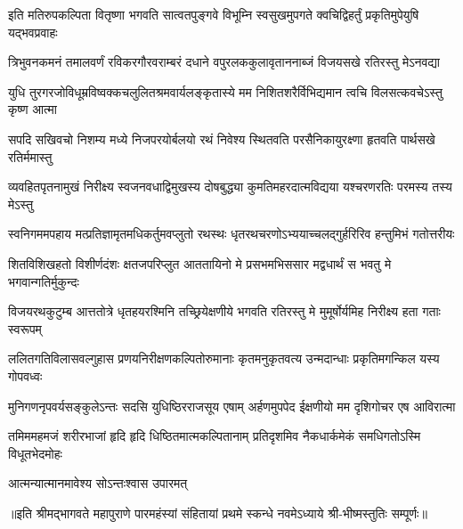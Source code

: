 

\twolineshloka
{इति मतिरुपकल्पिता वितृष्णा भगवति सात्वतपुङ्गवे विभूम्नि}
{स्वसुखमुपगते क्वचिद्विहर्तुं प्रकृतिमुपेयुषि यद्भवप्रवाहः}

\twolineshloka
{त्रिभुवनकमनं तमालवर्णं रविकरगौरवराम्बरं दधाने}
{वपुरलककुलावृताननाब्जं विजयसखे रतिरस्तु मेऽनवद्या}

\twolineshloka
{युधि तुरगरजोविधूम्रविष्वक्कचलुलितश्रमवार्यलङ्कृतास्ये}
{मम निशितशरैर्विभिद्यमान त्वचि विलसत्कवचेऽस्तु कृष्ण आत्मा}

\twolineshloka
{सपदि सखिवचो निशम्य मध्ये निजपरयोर्बलयो रथं निवेश्य}
{स्थितवति परसैनिकायुरक्ष्णा हृतवति पार्थसखे रतिर्ममास्तु}

\twolineshloka
{व्यवहितपृतनामुखं निरीक्ष्य स्वजनवधाद्विमुखस्य दोषबुद्ध्या}
{कुमतिमहरदात्मविद्यया यश्चरणरतिः परमस्य तस्य मेऽस्तु}

\twolineshloka
{स्वनिगममपहाय मत्प्रतिज्ञामृतमधिकर्तुमवप्लुतो रथस्थः}
{धृतरथचरणोऽभ्ययाच्चलद्गुर्हरिरिव हन्तुमिभं गतोत्तरीयः}

\twolineshloka
{शितविशिखहतो विशीर्णदंशः क्षतजपरिप्लुत आततायिनो मे}
{प्रसभमभिससार मद्वधार्थं स भवतु मे भगवान्गतिर्मुकुन्दः}

\twolineshloka
{विजयरथकुटुम्ब आत्ततोत्रे धृतहयरश्मिनि तच्छ्रियेक्षणीये}
{भगवति रतिरस्तु मे मुमूर्षोर्यमिह निरीक्ष्य हता गताः स्वरूपम्}

\twolineshloka
{ललितगतिविलासवल्गुहास प्रणयनिरीक्षणकल्पितोरुमानाः}
{कृतमनुकृतवत्य उन्मदान्धाः प्रकृतिमगन्किल यस्य गोपवध्वः}

\twolineshloka
{मुनिगणनृपवर्यसङ्कुलेऽन्तः सदसि युधिष्ठिरराजसूय एषाम्}
{अर्हणमुपपेद ईक्षणीयो मम दृशिगोचर एष आविरात्मा}

\twolineshloka
{तमिममहमजं शरीरभाजां हृदि हृदि धिष्ठितमात्मकल्पितानाम्}
{प्रतिदृशमिव नैकधार्कमेकं समधिगतोऽस्मि विधूतभेदमोहः}

{आत्मन्यात्मानमावेश्य सोऽन्तःश्वास उपारमत्}

{॥इति श्रीमद्भागवते महापुराणे पारमहंस्यां संहितायां प्रथमे स्कन्धे नवमेऽध्याये श्री-भीष्मस्तुतिः सम्पूर्णः॥}

